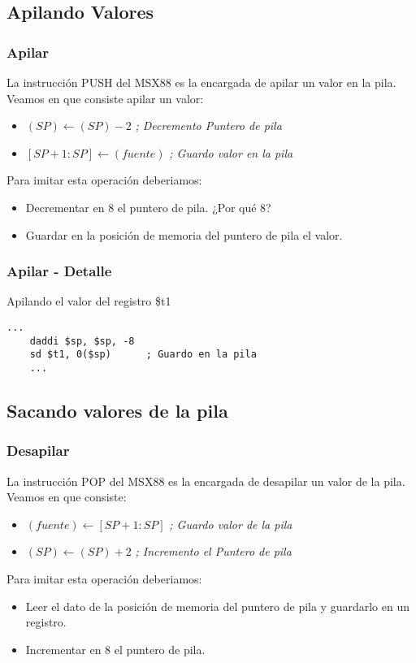 \documentclass{beamer}
\begin{document}
\subsection{Apilando Valores}
\begin{frame}
\frametitle{Apilar}
La instrucción PUSH del MSX88 es la encargada de apilar un valor en la pila. Veamos en que consiste apilar un valor:
\begin{itemize}
\item $(SP) \xleftarrow{} (SP) - 2$ \emph{; Decremento Puntero de pila}
\item $[SP+1:SP] \xleftarrow{} (fuente)$ \emph{; Guardo valor en la pila}
\end{itemize}
Para imitar esta operación deberiamos:
\begin{itemize}
\item Decrementar en 8 el puntero de pila. ¿Por qué 8?
\item Guardar en la posición de memoria del puntero de pila el valor.
\end{itemize}

\end{frame}

\begin{frame}[fragile]
\frametitle{Apilar - Detalle}


\begin{block}{Apilando el valor del registro \$t1}
\begin{lstlisting}[language=WinMIPS64,basicstyle=\ttfamily,keywordstyle=\color{blue}]
    ...
    daddi $sp, $sp, -8
    sd $t1, 0($sp)      ; Guardo en la pila
    ...
\end{lstlisting}
\end{block}

\end{frame}



\subsection{Sacando valores de la pila}
\begin{frame}
\frametitle{Desapilar}
La instrucción POP del MSX88 es la encargada de desapilar un valor de la pila. Veamos en que consiste:
\begin{itemize}
\item $(fuente) \xleftarrow{} [SP+1:SP]$ \emph{; Guardo valor de la pila}
\item $(SP) \xleftarrow{} (SP) + 2$ \emph{; Incremento el Puntero de pila}
\end{itemize}
Para imitar esta operación deberiamos:
\begin{itemize}
\item Leer el dato de la posición de memoria del puntero de pila y guardarlo en un registro.
\item Incrementar en 8 el puntero de pila.
\end{itemize}
\end{frame}
\end{document}
